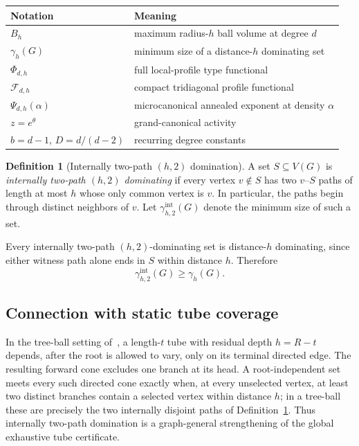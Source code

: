 \documentclass[11pt]{amsart}
\theoremstyle{definition}
\newtheorem{definition}[theorem]{Definition}
\newcommand{\Fcal}{\mathcal F}
\begin{document}
\begin{center}
\begin{tabular}{ll}
\toprule
Notation & Meaning\\
\midrule
$B_h$ & maximum radius-$h$ ball volume at degree $d$\\
$\gamma_h(G)$ & minimum size of a distance-$h$ dominating set\\
$\Phi_{d,h}$ & full local-profile type functional\\
$\Fcal_{d,h}$ & compact tridiagonal profile functional\\
$\Psi_{d,h}(\alpha)$ & microcanonical annealed exponent at density $\alpha$\\
$z=e^\theta$ & grand-canonical activity\\
$b=d-1$, $D=d/(d-2)$ & recurring degree constants\\
\bottomrule
\end{tabular}
\end{center}

\begin{definition}[Internally two-path $(h,2)$ domination]\label{def:two-path}
A set $S\subseteq V(G)$ is \emph{internally two-path $(h,2)$ dominating} if every vertex $v\notin S$ has two $v$--$S$ paths of length at most $h$ whose only common vertex is $v$.  In particular, the paths begin through distinct neighbors of $v$.  Let $\gamma_{h,2}^{\mathrm{int}}(G)$ denote the minimum size of such a set.
\end{definition}

Every internally two-path $(h,2)$-dominating set is distance-$h$ dominating, since either witness path alone ends in $S$ within distance $h$.  Therefore
\begin{equation}\label{eq:two-path-dominates}
 \gamma_{h,2}^{\mathrm{int}}(G)\ge \gamma_h(G).
\end{equation}

\subsection{Connection with static tube coverage}\label{subsec:tube-connection}
In the tree-ball setting of~\cite{Neuwirth2026Tube}, a length-$t$ tube with residual depth $h=R-t$ depends, after the root is allowed to vary, only on its terminal directed edge.  The resulting forward cone excludes one branch at its head.  A root-independent set meets every such directed cone exactly when, at every unselected vertex, at least two distinct branches contain a selected vertex within distance $h$; in a tree-ball these are precisely the two internally disjoint paths of Definition~\ref{def:two-path}.  Thus internally two-path domination is a graph-general strengthening of the global exhaustive tube certificate.
\end{document}
